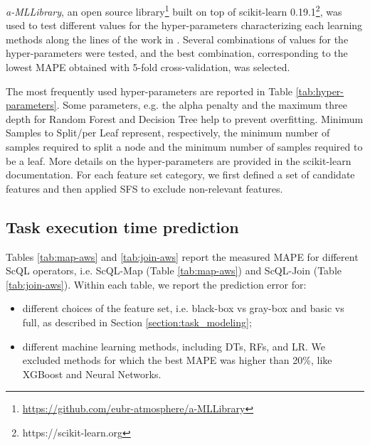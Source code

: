 \documentclass[a4paper, 10pt, conference]{ieeeconf}      %
\begin{document}


\textit{a-MLLibrary}, an open source  library\footnote{\url{https://github.com/eubr-atmosphere/a-MLLibrary}} built on top of scikit-learn 0.19.1\footnote{https://scikit-learn.org}, was used to test different values for the hyper-parameters characterizing each learning methods along the lines of the work in \cite{ARDAGNA2019}.
Several combinations of values for the hyper-parameters were tested, and the best combination, corresponding to the lowest MAPE obtained with 5-fold cross-validation, was selected.

The most frequently used hyper-parameters are reported in Table \ref{tab:hyper-parameters}. 
Some parameters, e.g. the alpha penalty and the maximum three depth for Random Forest and Decision Tree help to prevent overfitting. Minimum Samples to Split/per Leaf represent, respectively, the minimum number of samples required to split a node and the minimum number of samples required to be a leaf. More details on the hyper-parameters are provided in the scikit-learn documentation.
\color{black}
For each feature set category, we first defined a set of candidate features and then applied SFS to exclude non-relevant features.\color{black}

\subsection{Task execution time prediction}
\label{subsec:results-task}
Tables \ref{tab:map-aws} and   \ref{tab:join-aws}  report the measured MAPE for different ScQL operators, i.e. ScQL-Map (Table \ref{tab:map-aws}) and ScQL-Join (Table \ref{tab:join-aws}).
Within each table, we report the prediction error for:
\begin{itemize}
    \item different choices of the feature set, i.e. black-box vs gray-box and basic vs full, as described in Section \ref{section:task_modeling};
    \item different machine learning methods, including DTs, RFs, and LR. We excluded methods for which the best MAPE was higher than 20\%, like XGBoost and Neural Networks.
\end{itemize}



\end{document}
